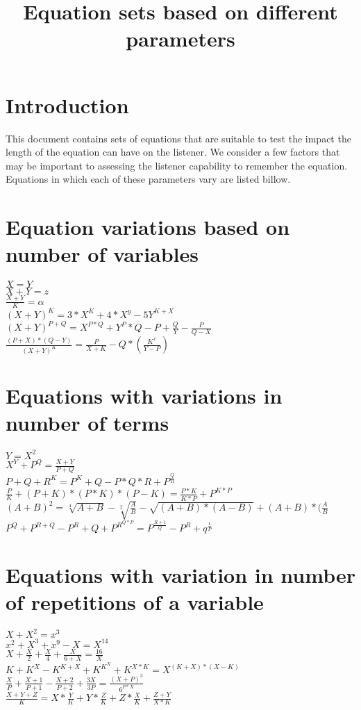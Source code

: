 \documentclass{article}
\begin{document}
\title{Equation sets based on different parameters}
\maketitle
\section{Introduction}
This document contains sets of equations that are suitable to test the impact the length of the equation can have on the listener. We consider a few factors that may be important to assessing the listener capability to remember the equation. Equations in which each of these parameters vary are listed billow.  
\section{Equation variations based on number of variables}
$X=Y$\\
$X+Y=z$\\
$\frac{X+Y}{K}=\alpha$\\
$(X+Y)^K = 3*X^K+4*X^y-5Y^{K+X}$\\
$(X+Y)^{P+Q} = X^{P*Q}+Y^P*Q-P+\frac{Q}{Y}-\frac{P}{Q-X}$\\
$\frac{(P+X)*(Q-Y)}{(X+Y)^K} = \frac{P}{X+K}-Q*(\frac{K^x}{Y-P})$\\
\section{Equations with variations in number of terms}
$Y = X^2$\\
$X^Y+P^Q = \frac{X+Y}{P+Q}$\\
${P+Q+R}^K = P^K+Q-P*Q*R+P^{\frac{Q}{R}}$\\
$\frac{P}{K} + (P+K)*(P*K)*(P-K) = \frac{P*K}{K*P}+P^{K*P}$\\
$(A+B)^2 = \sqrt[4]{A+B}-\sqrt[2]{\frac{A}{B}}-\sqrt{(A+B)*(A-B)}+(A+B)*(\frac{A}{B}$\\
$P^Q+P^{R+Q}-P^R+Q+P^{R^{Q*P}} = P^{\frac{R+1}{Q}}-P^{R}+q^{\frac{1}{P}}$\\
\section{Equations with variation in number of repetitions of a variable}
$X+X^2 = x^3$\\
$x^2+X^3+x^9-X = X^{14}$\\
$X+\frac{X}{2}+\frac{X}{4}+\frac{X}{6+X} = \frac{16}{X}$\\
$K+K^X-K^{K+X}+K^{K^X}+K^{X*K} = X^{(K+X)*(X-K)}$\\
$\frac{X}{P}+\frac{X+1}{P+1}-\frac{X+2}{P+2}+\frac{3X}{3P} = \frac{(X+P)^3}{6^{P*X}}$\\
$\frac{X+Y+Z}{K} = X*\frac{Y}{K} + Y*\frac{Z}{K}+Z*\frac{X}{K}+\frac{Z+Y}{X*K}$\\
\end{document}
